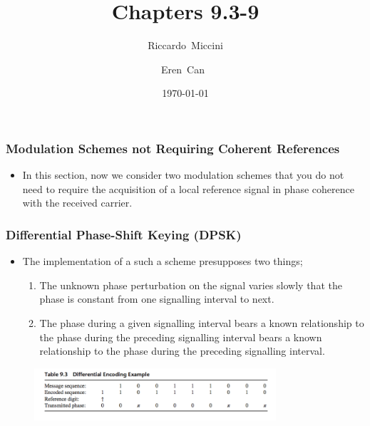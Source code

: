 \documentclass{beamer}
\title{Chapters 9.3-9}
\subtitle{}
\author[Riccardo \and Eren]{Riccardo~Miccini\inst{1} \and Eren~Can~\inst{1}}
\institute[DTU]
{
	\inst{1}
	Technical University of Denmark\\
	Digital Communication
}
\date{\today}
\begin{document}
\frame{\titlepage}

\begin{frame}
	\frametitle{Modulation Schemes not Requiring Coherent References}
	\begin{itemize}
		\item In this section, now we consider two modulation schemes that you do not need to require the acquisition of  a local reference signal in phase coherence with the received carrier.
	\end{itemize}
\end{frame}

\begin{frame}
	\frametitle{Differential Phase-Shift Keying  (DPSK)}
	\begin{itemize}
		\item The implementation of a such a scheme presupposes two things;
		\begin{enumerate}
		\item The unknown phase perturbation on the signal varies  slowly that the phase is constant from one signalling interval to next.
		\item  The phase during a given signalling interval bears a known relationship to the phase during the preceding signalling interval bears a known relationship to the phase during the preceding signalling interval.
	\end{enumerate}
	\end{itemize}
	\begin{figure}
	\includegraphics[width=0.8\textwidth]{9_3.png}
	\end{figure}
\end{frame}
\end{document}
